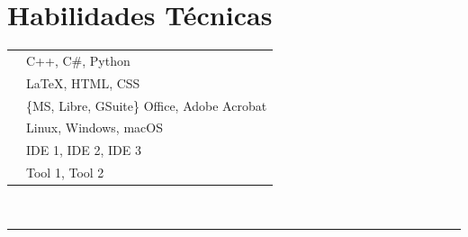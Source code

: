 \documentclass[oneside]{article}
\begin{document}
{\begin{minipage}[t][\textheight-2\fboxsep-2\fboxrule][t]{\dimexpr0.40\textwidth-2\fboxrule-2\fboxsep\relax}
        \section*{\large Habilidades Técnicas}
        \begin{tabularx}{\textwidth}{cY}
            \faCode{}        & C++, C\#, Python\\
            \faPen*{}        & \LaTeX, HTML, CSS \\
            \faFont{}        & \{MS, Libre, GSuite\} Office, Adobe Acrobat \\
            \faCogs{}        & Linux, Windows, macOS \\
            \faLaptopCode{}  & IDE 1, IDE 2, IDE 3 \\
            \faToolbox{}     & Tool 1, Tool 2 
        \end{tabularx}
        \vspace{1pt} \\
        \rule{\linewidth}{0.4pt}
    \end{minipage}
}
\hfill
\end{document}
